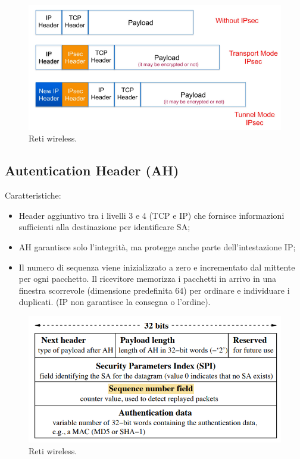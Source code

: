 \begin{figure}[h]
    \centering
    \includegraphics[width=1\textwidth]{images/chapter9/9-5.png}
    \caption{Reti wireless.}
    \label{fig:9-5}
\end{figure}

\subsection{Autentication Header (AH)}

Caratteristiche:
\begin{itemize}
    \item Header aggiuntivo tra i livelli 3 e 4 (TCP e IP) che fornisce informazioni sufficienti alla destinazione per identificare SA;
	\item AH garantisce solo l'integrità, ma protegge anche parte dell'intestazione IP;
    \item Il numero di sequenza viene inizializzato a zero e incrementato dal mittente per ogni pacchetto. Il ricevitore memorizza i pacchetti in arrivo in una finestra scorrevole (dimensione predefinita 64) per ordinare e individuare i duplicati. (IP non garantisce la consegna o l'ordine).
\end{itemize}

\begin{figure}[h]
    \centering
    \includegraphics[width=1\textwidth]{images/chapter9/9-6.png}
    \caption{Reti wireless.}
    \label{fig:9-6}
\end{figure}

